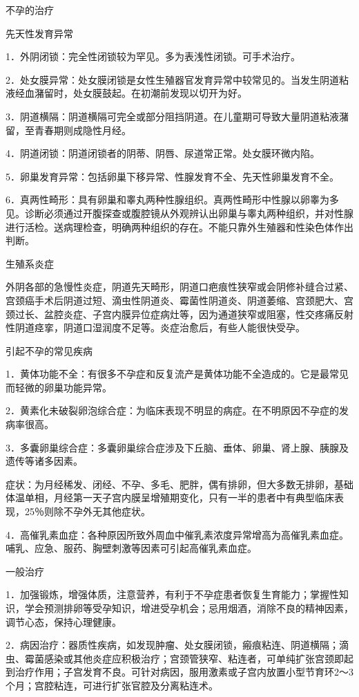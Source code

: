 \documentclass[12pt,UTF8,openany]{ctexbook}
\begin{document}
不孕的治疗


先天性发育异常

1．外阴闭锁：完全性闭锁较为罕见。多为表浅性闭锁。可手术治疗。

2．处女膜异常：处女膜闭锁是女性生殖器官发育异常中较常见的。当发生阴道粘液经血潴留时，处女膜鼓起。在初潮前发现以切开为好。

3．阴道横隔：阴道横隔可完全或部分阻挡阴道。在儿童期可导致大量阴道粘液潴留，至青春期则成隐性月经。

4．阴道闭锁：阴道闭锁者的阴蒂、阴唇、尿道常正常。处女膜环微内陷。

5．卵巢发育异常：包括卵巢下移异常、性腺发育不全、先天性卵巢发育不全。

6．真两性畸形：具有卵巢和睾丸两种性腺组织。真两性畸形中性腺以卵睾为多见。诊断必须通过开腹探查或腹腔镜从外观辨认出卵巢与睾丸两种组织，并对性腺进行活检。送病理检查，明确两种组织的存在。不能只靠外生殖器和性染色体作出判断。

生殖系炎症

外阴各部的急慢性炎症，阴道先天畸形，阴道口疤痕性狭窄或会阴修补缝合过紧、宫颈癌手术后阴道过短、滴虫性阴道炎、霉菌性阴道炎、阴道萎缩、宫颈肥大、宫颈过长、盆腔炎症、子宫内膜异位症病灶等，因为通道狭窄或阻塞，性交疼痛反射性阴道痉挛，阴道口湿润度不足等。炎症治愈后，有些人能很快受孕。

引起不孕的常见疾病

1．黄体功能不全：有很多不孕症和反复流产是黄体功能不全造成的。它是最常见而轻微的卵巢功能异常。

2．黄素化未破裂卵泡综合症：为临床表现不明显的病症。在不明原因不孕症的发病率很高。

3．多囊卵巢综合症：多囊卵巢综合症涉及下丘脑、垂体、卵巢、肾上腺、胰腺及遗传等诸多因素。

症状：为月经稀发、闭经、不孕、多毛、肥胖，偶有排卵，但大多数无排卵，基础体温单相，月经第一天子宫内膜呈增殖期变化，只有一半的患者中有典型临床表现，25％则除不孕外无其他症状。

4．高催乳素血症：各种原因所致外周血中催乳素浓度异常增高为高催乳素血症。哺乳、应急、服药、胸壁刺激等因素可引起高催乳素血症。

一般治疗

1．加强锻炼，增强体质，注意营养，有利于不孕症患者恢复生育能力；掌握性知识，学会预测排卵等受孕知识，增进受孕机会；忌用烟酒，消除不良的精神因素，调节心态，保持心理健康。

2．病因治疗：器质性疾病，如发现肿瘤、处女膜闭锁，瘢痕粘连、阴道横隔；滴虫、霉菌感染或其他炎症应积极治疗；宫颈管狭窄、粘连者，可单纯扩张宫颈即起到治疗作用；子宫发育不良。可针对病因，服用激素或子宫内放置小型节育环2～3个月；宫腔粘连，可进行扩张官腔及分离粘连术。
\end{document}
